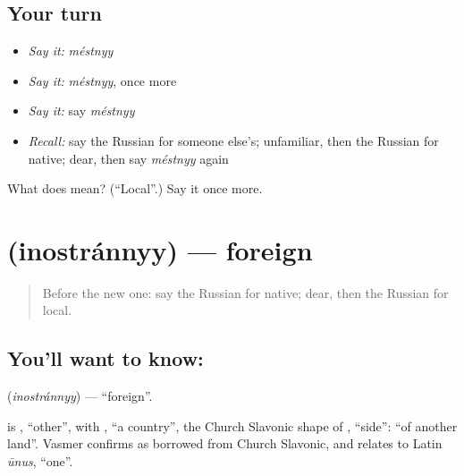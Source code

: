 \subsection*{Your turn}
\begin{itemize}
\raggedright
  \item \emph{Say it:} \emph{méstnyy}
  \item \emph{Say it:} \emph{méstnyy}, once more
  \item \emph{Say it:} say \emph{méstnyy}
  \item \emph{Recall:} say the Russian for someone else's; unfamiliar, then the Russian for native; dear, then say \emph{méstnyy} again
\end{itemize}

\begin{tcolorbox}[breakable,colback=teal!4,colframe=teal!35!black,title={Before you move on}]
What does  mean? (\textquotedblleft{}Local\textquotedblright{}.) Say it once more.
\end{tcolorbox}
\section[\texorpdfstring{\ru{иностранный} (inostránnyy)}{иностранный (inostránnyy)}]{ (inostránnyy) — foreign}

\label{lesson:RU-C189-inostrannyy}



\begin{quote}
Before the new one: say the Russian for native; dear, then the Russian for local.
\end{quote}

\subsection*{You'll want to know: }
\textbf{} (\emph{inostránnyy}) — \textquotedblleft{}foreign\textquotedblright{}.

\begin{cousinweb}
\textbf{} is \emph{}, \textquotedblleft{}other\textquotedblright{}, with \emph{}, \textquotedblleft{}a country\textquotedblright{}, the Church Slavonic shape of \emph{}, \textquotedblleft{}side\textquotedblright{}: \textquotedblleft{}of another land\textquotedblright{}. Vasmer confirms \emph{} as borrowed from Church Slavonic, and relates \emph{} to Latin \emph{ūnus}, \textquotedblleft{}one\textquotedblright{}.
\end{cousinweb}

